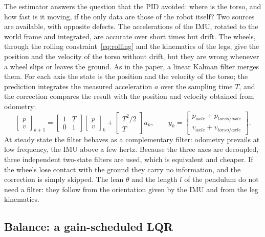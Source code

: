 \documentclass[11pt,a4paper]{article}
\begin{document}
The estimator answers the question that the PID avoided: where is the torso, and how fast is it moving, if the
only data are those of the robot itself? Two sources are available, with opposite defects. The accelerations of
the IMU, rotated to the world frame and integrated, are accurate over short times but drift. The wheels, through
the rolling constraint~\eqref{eq:rolling} and the kinematics of the legs, give the position and the velocity of the
torso without drift, but they are wrong whenever a wheel slips or leaves the ground. As in the paper, a linear
Kalman filter merges them. For each axis the state is the position and the velocity of the torso; the prediction
integrates the measured acceleration $a$ over the sampling time $T$, and the correction compares the result with the
position and velocity obtained from odometry:
\begin{equation}
  \begin{bmatrix} p\\ v\end{bmatrix}_{k+1}=
  \begin{bmatrix} 1&T\\0&1\end{bmatrix}\begin{bmatrix} p\\ v\end{bmatrix}_{k}
  +\begin{bmatrix}T^2/2\\ T\end{bmatrix}a_k,
  \qquad
  y_k=\begin{bmatrix}p_{axle}+p_{torso/axle}\\ v_{axle}+v_{torso/axle}\end{bmatrix}.
  \label{eq:kalman}
\end{equation}
At steady state the filter behaves as a complementary filter: odometry prevails at low frequency, the IMU above a
few hertz. Because the three axes are decoupled, three independent two-state filters are used, which
is equivalent and cheaper. If the wheels lose contact with the ground they carry no information, and the correction
is simply skipped. The lean $\theta$ and the
length $l$ of the pendulum do not need a filter: they follow from the orientation given by the IMU and from the
leg kinematics.

\subsection{Balance: a gain-scheduled LQR}
\end{document}
